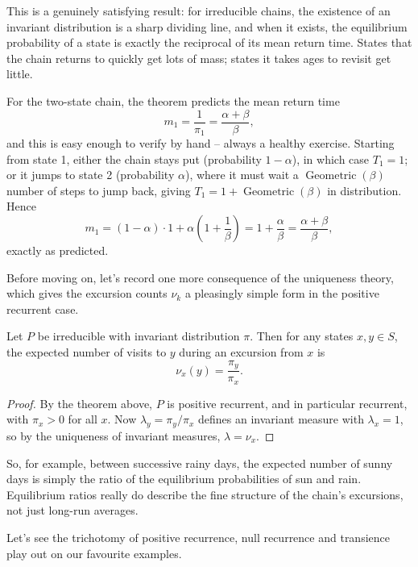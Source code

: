 This is a genuinely satisfying result: for irreducible chains, the existence of an invariant distribution is a sharp dividing line, and when it exists, the equilibrium probability of a state is exactly the reciprocal of its mean return time. States that the chain returns to quickly get lots of mass; states it takes ages to revisit get little.

\begin{example}
	For the two-state chain, the theorem predicts the mean return time
	$$
	m_1 = \frac{1}{\pi_1} = \frac{\alpha + \beta}{\beta},
	$$
	and this is easy enough to verify by hand -- always a healthy exercise. Starting from state 1, either the chain stays put (probability $1 - \alpha$), in which case $T_1 = 1$; or it jumps to state 2 (probability $\alpha$), where it must wait a $\operatorname{Geometric}(\beta)$ number of steps to jump back, giving $T_1 = 1 + \operatorname{Geometric}(\beta)$ in distribution. Hence
	$$
	m_1 = (1 - \alpha) \cdot 1 + \alpha \left(1 + \frac{1}{\beta}\right) = 1 + \frac{\alpha}{\beta} = \frac{\alpha + \beta}{\beta},
	$$
	exactly as predicted.
\end{example}

Before moving on, let's record one more consequence of the uniqueness theory, which gives the excursion counts $\nu_k$ a pleasingly simple form in the positive recurrent case.

\begin{corollary}
	Let $P$ be irreducible with invariant distribution $\pi$. Then for any states $x, y \in S$, the expected number of visits to $y$ during an excursion from $x$ is
	$$
	\nu_x(y) = \frac{\pi_y}{\pi_x}.
	$$
\end{corollary}
\begin{proof}
	By the theorem above, $P$ is positive recurrent, and in particular recurrent, with $\pi_x > 0$ for all $x$. Now $\lambda_y = \pi_y / \pi_x$ defines an invariant measure with $\lambda_x = 1$, so by the uniqueness of invariant measures, $\lambda = \nu_x$.
\end{proof}

So, for example, between successive rainy days, the expected number of sunny days is simply the ratio of the equilibrium probabilities of sun and rain. Equilibrium ratios really do describe the fine structure of the chain's excursions, not just long-run averages.

Let's see the trichotomy of positive recurrence, null recurrence and transience play out on our favourite examples.

